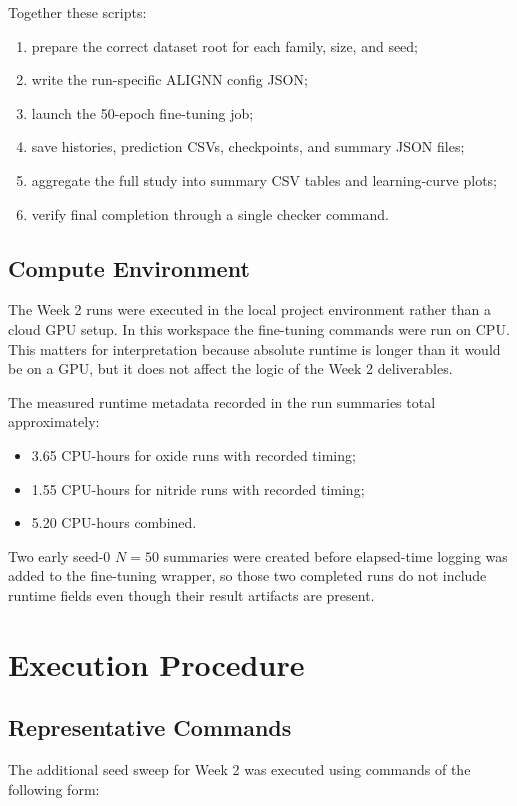 \documentclass[11pt]{article}
\begin{document}
Together these scripts:
\begin{enumerate}
  \item prepare the correct dataset root for each family, size, and seed;
  \item write the run-specific ALIGNN config JSON;
  \item launch the 50-epoch fine-tuning job;
  \item save histories, prediction CSVs, checkpoints, and summary JSON files;
  \item aggregate the full study into summary CSV tables and learning-curve plots;
  \item verify final completion through a single checker command.
\end{enumerate}

\subsection{Compute Environment}
The Week 2 runs were executed in the local project environment rather than a cloud GPU setup.
In this workspace the fine-tuning commands were run on CPU.
This matters for interpretation because absolute runtime is longer than it would be on a GPU, but it does not affect the logic of the Week 2 deliverables.

The measured runtime metadata recorded in the run summaries total approximately:
\begin{itemize}
  \item 3.65 CPU-hours for oxide runs with recorded timing;
  \item 1.55 CPU-hours for nitride runs with recorded timing;
  \item 5.20 CPU-hours combined.
\end{itemize}

Two early seed-0 $N=50$ summaries were created before elapsed-time logging was added to the fine-tuning wrapper, so those two completed runs do not include runtime fields even though their result artifacts are present.

\section{Execution Procedure}
\subsection{Representative Commands}
The additional seed sweep for Week 2 was executed using commands of the following form:
\end{document}
